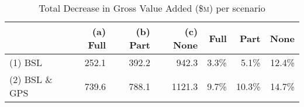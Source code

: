 \begin{table}[H]
\centering
\caption{Total Decrease in Gross Value Added (\$\textsc{m}) per scenario} 
\begin{tabular}{lrrr|rrr}
  \hline
 &  (a) Full & (b) Part & (c) None & Full & Part & None \\ 
  \hline
(1) BSL & 252.1 & 392.2 & 942.3 & 3.3\% & 5.1\% & 12.4\% \\ 
  (2) BSL \& GPS & 739.6 & 788.1 & 1121.3 & 9.7\% & 10.3\% & 14.7\% \\ 
   \hline
\end{tabular}
\end{table}
